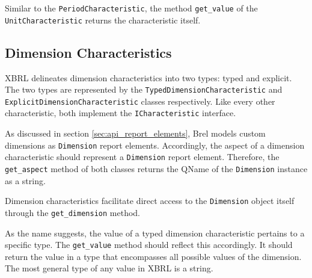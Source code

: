 Similar to the \texttt{PeriodCharacteristic}, the method \texttt{get\_value} of the \texttt{UnitCharacteristic} returns the characteristic itself.


\subsection{Dimension Characteristics}

XBRL delineates dimension characteristics into two types: typed and explicit.
The two types are represented by the \texttt{TypedDimensionCharacteristic} and \texttt{ExplicitDimensionCharacteristic} classes respectively.
Like every other characteristic, both implement the \texttt{ICharacteristic} interface.

As discussed in section \ref{sec:api_report_elements}, Brel models custom dimensions as \texttt{Dimension} report elements.
Accordingly, the aspect of a dimension characteristic should represent a \texttt{Dimension} report element.
Therefore, the \texttt{get\_aspect} method of both classes returns the QName of the \texttt{Dimension} instance as a string.

Dimension characteristics facilitate direct access to the \texttt{Dimension} object itself through the \texttt{get\_dimension} method.

As the name suggests, the value of a typed dimension characteristic pertains to a specific type.
The \texttt{get\_value} method should reflect this accordingly.
It should return the value in a type that encompasses all possible values of the dimension.
The most general type of any value in XBRL is a string.

